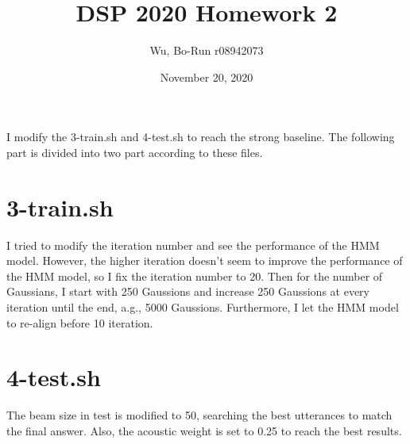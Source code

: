 \documentclass{article}
\title{DSP 2020 Homework 2}
\author{Wu, Bo-Run r08942073}
\date{November 20, 2020}
\begin{document}
\maketitle

\begin{center}
    I modify the 3-train.sh and 4-test.sh to reach the strong baseline. The following part is divided into two part according to these files.
\end{center}

\section{3-train.sh}

I tried to modify the iteration number and see the performance of the HMM model. However, the higher iteration doesn't seem to improve the performance of the HMM model, so I fix the iteration number to 20. Then for the number of Gaussians, I start with 250 Gaussions and increase 250 Gaussions at every iteration until the end, a.g., 5000 Gaussions. Furthermore, I let the HMM model to re-align before 10 iteration.

\section{4-test.sh}

The beam size in test is modified to 50, searching the best utterances to match the final answer. Also, the acoustic weight is set to 0.25 to reach the best results.
\end{document}
